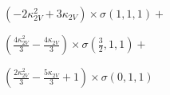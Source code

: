 $\left(- 2 \kappa_{2V}^{2} + 3 \kappa_{2V}\right) \times \sigma{\left(1,1,1 \right)} +$

$ \left(\frac{4 \kappa_{2V}^{2}}{3} - \frac{4 \kappa_{2V}}{3}\right) \times \sigma{\left(\frac{3}{2},1,1 \right)} +$

$ \left(\frac{2 \kappa_{2V}^{2}}{3} - \frac{5 \kappa_{2V}}{3} + 1\right) \times \sigma{\left(0,1,1 \right)}$
